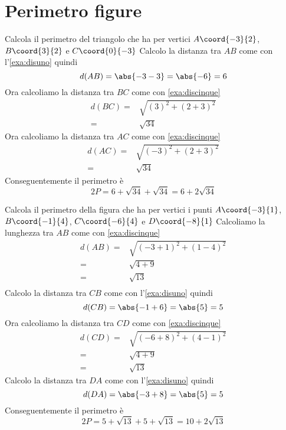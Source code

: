 \section{Perimetro figure}
\begin{exercise}
	Calcola il perimetro del triangolo che ha per vertici $A\coord{-3}{2}$, $B\coord{3}{2}$ e $C\coord{0}{-3}$
	\tcblower
	Calcolo la distanza tra $AB$ come con l'\cref{exa:disuno} 
	quindi \[d(AB)=\abs{-3-3}=\abs{-6}=6\] Ora calcoliamo la distanza tra $BC$ come con \cref{exa:discinque} 
	\begin{align*}
		d(BC)=&\sqrt{(3)^2+(2+3)^2}\\
		=&\sqrt{34}
	\end{align*}
	Ora calcoliamo la distanza tra $AC$ come con \cref{exa:discinque} 
	\begin{align*}
		d(AC)=&\sqrt{(-3)^2+(2+3)^2}\\
		=&\sqrt{34}
	\end{align*}
	Conseguentemente il perimetro è
	\[2P=6+\sqrt{34}+\sqrt{34}=6+2\sqrt{34}\]
	\begin{center}
		
		\label{fig:EsRieDistanza11}
	\end{center}
\end{exercise}
\begin{exercise}
	Calcola il perimetro della figura che ha per vertici i punti $A\coord{-3}{1}$, $B\coord{-1}{4}$, $C\coord{-6}{4}$ e  $D\coord{-8}{1}$
	\tcblower
	Calcoliamo la lunghezza tra $AB$ come con \cref{exa:discinque} 
	\begin{align*}
		d(AB)=&\sqrt{(-3+1)^2+(1-4)^2}\\
		=&\sqrt{4+9}\\
		=&\sqrt{13}\\
	\end{align*}
	Calcolo la distanza tra $CB$ come con l'\cref{exa:disuno} 
	quindi \[d(CB)=\abs{-1+6}=\abs{5}=5\]
	Ora calcoliamo la distanza tra $CD$ come con \cref{exa:discinque} 
	\begin{align*}
		d(CD)=&\sqrt{(-6+8)^2+(4-1)^2}\\
		=&\sqrt{4+9}\\
		=&\sqrt{13}
	\end{align*}
	Calcolo la distanza tra $DA$ come con l'\cref{exa:disuno} 
	quindi \[d(DA)=\abs{-3+8}=\abs{5}=5\]
	Conseguentemente il perimetro è
	\[2P=5+\sqrt{13}+5+\sqrt{13}=10+2\sqrt{13}\]
	\begin{center}
		
		\label{fig:EsRieDistanza12}
	\end{center}
\end{exercise}
